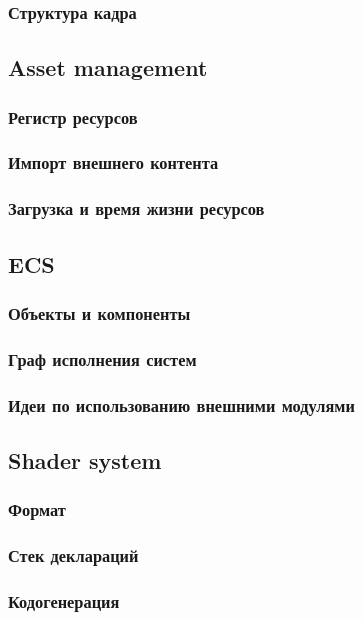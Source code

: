 \subsubsection{Структура кадра}

\subsection{Asset management}
\subsubsection{Регистр ресурсов}
\subsubsection{Импорт внешнего контента}
\subsubsection{Загрузка и время жизни ресурсов}

\subsection{ECS}
\subsubsection{Объекты и компоненты}
\subsubsection{Граф исполнения систем}
\subsubsection{Идеи по использованию внешними модулями}

\subsection{Shader system}
\subsubsection{Формат}
\subsubsection{Стек деклараций}
\subsubsection{Кодогенерация}
